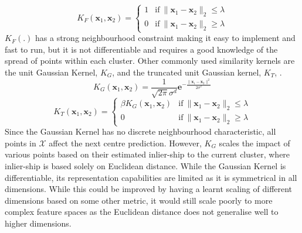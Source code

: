 \documentclass[../thesis.tex]{subfiles}
\begin{document}
\begin{equation}
    K_F(\mathbf x_1, \mathbf x_2)=
    \begin{cases}
      1 & \text{if}\ \|\mathbf x_1 - \mathbf x_2\|_2 \leqslant \lambda \\
      0 & \text{if}\ \|\mathbf x_1 - \mathbf x_2\|_2 \geqslant \lambda
    \end{cases}
\end{equation}
$K_F(.)$ has a strong neighbourhood constraint making it easy to implement and fast to run, but it is not differentiable and requires a good knowledge of the spread of points within each cluster.
Other commonly used similarity kernels are the unit Gaussian Kernel, $K_G$,  and the truncated unit Gaussian kernel, $K_{T}$,  \cite{Cheng1995}. 
\begin{equation}
    K_G(\mathbf x_1, \mathbf x_2)=\frac{1}{\sqrt{2\pi} \sigma^d}\mathbf{e}^{-\frac{\|\mathbf x_1 - \mathbf x_2\|^2}{2\sigma^2}}
\end{equation}
\begin{equation}
    K_{T}(\mathbf x_1, \mathbf x_2)=
    \begin{cases}
      \beta K_G(\mathbf x_1, \mathbf x_2) & \text{if}\ \|\mathbf x_1 - \mathbf x_2\|_2 \leqslant \lambda \\
      0 & \text{if}\ \|\mathbf x_1 - \mathbf x_2\|_2 \geqslant \lambda
    \end{cases}
\end{equation}
Since the Gaussian Kernel has no discrete neighbourhood characteristic, all points in $\mathcal X$ affect the next centre prediction.
However, $K_G$ scales the impact of various points based on their estimated inlier-ship to the current cluster, where inlier-ship is based solely on Euclidean distance. 
While the Gaussian Kernel is differentiable, its representation capabilities are limited as it is symmetrical in all dimensions. 
While this could be improved by having a learnt scaling of different dimensions based on some other metric, it would still scale poorly to more complex feature spaces as the Euclidean distance does not generalise well to higher dimensions.
\end{document}
